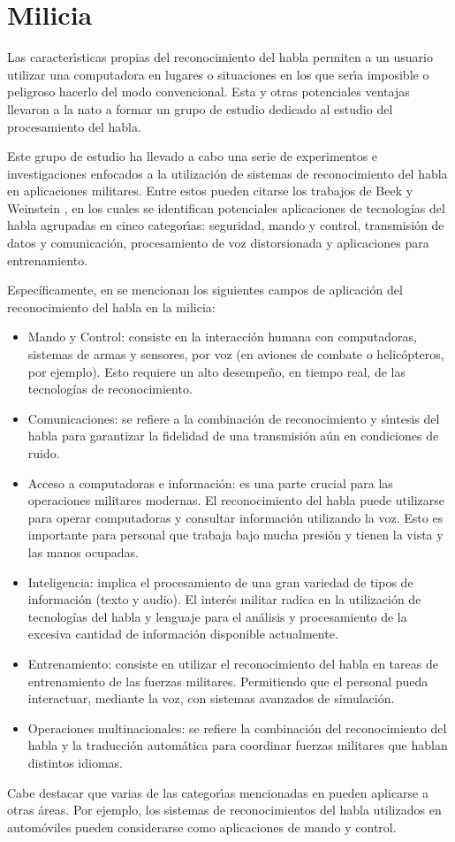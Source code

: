 \section{Milicia}
\label{sec:milicia}

Las caracter{\'\i}sticas propias del reconocimiento del habla permiten a un usuario utilizar 
una computadora en lugares o situaciones en los que ser{\'\i}a imposible o peligroso hacerlo 
del modo convencional\cite{Rufiner2004}.
Esta y otras potenciales ventajas llevaron a la \gls{nato} a formar un grupo de estudio dedicado al 
estudio del procesamiento del habla.

Este grupo de estudio ha llevado a cabo una serie de experimentos e investigaciones
enfocados a la utilización de sistemas de reconocimiento del habla en aplicaciones militares.
Entre estos pueden citarse los trabajos de Beek \cite{BeekAn1977} y 
Weinstein \cite{WeinsteinOpportunities1991}, en los cuales se identifican potenciales aplicaciones de 
tecnolog\'ias del habla agrupadas en cinco categor{\'\i}as: seguridad, mando y control, 
transmisi\'on de datos y comunicaci\'on, procesamiento de voz distorsionada y aplicaciones para
entrenamiento.

Espec\'ificamente, en \cite{PigeonUse2006} se mencionan los siguientes campos de aplicaci\'on del 
reconocimiento del habla en la milicia:

\begin{itemize}
    \item Mando y Control: consiste en la interacci\'on humana con computadoras, sistemas
	de armas y sensores, por voz (en aviones de combate o helic\'opteros, por ejemplo). Esto
	requiere un alto desempe\~no, en tiempo real, de las tecnolog\'ias de reconocimiento.
	\item Comunicaciones: se refiere a la combinaci\'on de reconocimiento y s{\'\i}ntesis del habla para
	garantizar la fidelidad de una transmisi\'on a\'un en condiciones de ruido.
    \item Acceso a computadoras e informaci\'on: es una parte crucial para las operaciones militares modernas. El
	reconocimiento del habla puede utilizarse para operar computadoras y consultar informaci\'on utilizando la voz.
	Esto es importante para personal que trabaja bajo mucha presi\'on y tienen la vista y las manos ocupadas.
    \item Inteligencia: implica el procesamiento de una gran variedad de tipos de informaci\'on (texto y audio). 
    El inter\'es militar radica en la utilizaci\'on de tecnolog\'ias del habla y lenguaje para el an\'alisis y
    procesamiento de la excesiva cantidad de informaci\'on disponible actualmente.
    \item Entrenamiento: consiste en utilizar el reconocimiento del habla en tareas de entrenamiento de las fuerzas
	militares. Permitiendo que el personal pueda interactuar, mediante la voz, con sistemas avanzados de simulaci\'on.
	\item Operaciones multinacionales: se refiere la combinaci\'on del reconocimiento del habla y la traducci\'on
	autom\'atica para coordinar fuerzas militares que hablan distintos idiomas.
\end{itemize}

Cabe destacar que varias de las categor{\'\i}as mencionadas en \cite{PigeonUse2006} pueden aplicarse
a otras \'areas. Por ejemplo, los sistemas de reconocimientos del habla utilizados en autom\'oviles 
pueden considerarse como aplicaciones de mando y control.